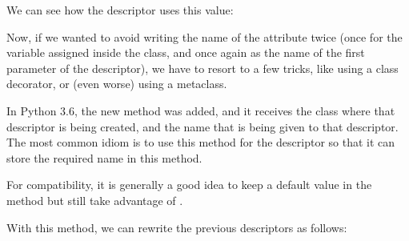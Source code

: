 \documentclass[a4paper,10pt,english]{sphinxmanual}
\begin{document}
We can see how the descriptor uses this value:

\begin{sphinxVerbatim}[commandchars=\\\{\}]
  
  
\end{sphinxVerbatim}

Now, if we wanted to avoid writing the name of the attribute twice (once for the variable
assigned inside the class, and once again as the name of the first parameter of the
descriptor), we have to resort to a few tricks, like using a class decorator, or (even worse)
using a metaclass.

In Python 3.6, the new method  was added, and it receives the class where
that descriptor is being created, and the name that is being given to that descriptor. The
most common idiom is to use this method for the descriptor so that it can store the required
name in this method.

For compatibility, it is generally a good idea to keep a default value in the 
method but still take advantage of .

With this method, we can rewrite the previous descriptors as follows:

\begin{sphinxVerbatim}[commandchars=\\\{\}]
 
      
          

       
          

\end{sphinxVerbatim}
\end{document}
